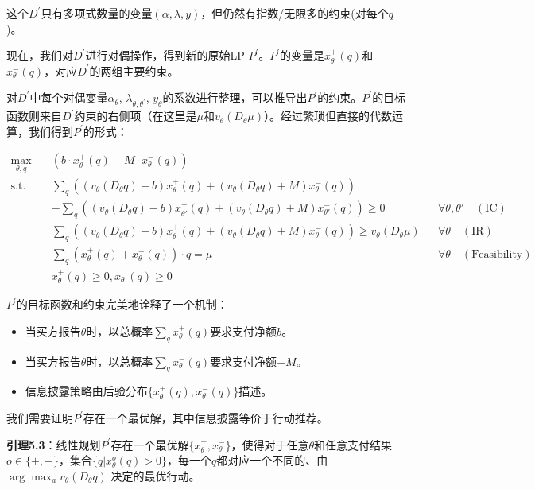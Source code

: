 这个$D^\prime$只有多项式数量的变量$(\alpha,\lambda,y)$，但仍然有指数/无限多的约束(对每个$q$)。

现在，我们对$D^\prime$进行对偶操作，得到新的原始LP $P^\prime$。$P^\prime$的变量是$x_{\theta}^{+}(q)$和$x_{\theta}^{-}(q)$，对应$D^\prime$的两组主要约束。

对$D^\prime$中每个对偶变量$\alpha_\theta$, $\lambda_{\theta,\theta^\prime}$, $y_\theta$的系数进行整理，可以推导出$P^\prime$的约束。$P^\prime$的目标函数则来自$D^\prime$约束的右侧项（在这里是$\mu$和$v_\theta (D_\theta \mu)$）。经过繁琐但直接的代数运算，我们得到$P^\prime$的形式：

\begin{align*}
    \max_{\theta, q} \quad & \left( b \cdot x_{\theta}^{+}(q) - M \cdot x_{\theta}^{-}(q) \right) \\
    \text{s.t.} \quad & \sum_{q} \left((v_{\theta}(D_{\theta}q) - b)x_{\theta}^{+}(q) + (v_{\theta}(D_{\theta}q) + M)x_{\theta}^{-}(q)\right) \\
    & - \sum_{q} \left((v_{\theta}(D_{\theta}q) - b)x_{\theta'}^{+}(q) + (v_{\theta}(D_{\theta}q) + M)x_{\theta'}^{-}(q)\right) \geq 0 && \forall \theta, \theta' \quad (\text{IC}) \\
    & \sum_{q} \left((v_{\theta}(D_{\theta}q) - b)x_{\theta}^{+}(q) + (v_{\theta}(D_{\theta}q) + M)x_{\theta}^{-}(q)\right) \geq v_{\theta}(D_{\theta}\mu) && \forall \theta \quad (\text{IR}) \\
    & \sum_{q} (x_{\theta}^{+}(q) + x_{\theta}^{-}(q)) \cdot q = \mu && \forall \theta \quad (\text{Feasibility}) \\
    & x_{\theta}^{+}(q) \geq 0, x_{\theta}^{-}(q) \geq 0
\end{align*}

$P^\prime$的目标函数和约束完美地诠释了一个机制：
\begin{itemize}
    \item 当买方报告$\theta$时，以总概率$\sum\limits_{q} x_{\theta}^{+}(q)$要求支付净额$b$。
    \item 当买方报告$\theta$时，以总概率$\sum\limits_{q} x_{\theta}^{-}(q)$要求支付净额$-M$。
    \item 信息披露策略由后验分布$\{x_{\theta}^{+} (q), x_{\theta}^{-}(q)\}$描述。
\end{itemize}

我们需要证明$P^\prime$存在一个最优解，其中信息披露等价于行动推荐。

\textbf{引理5.3}：线性规划$P^\prime$存在一个最优解$\{x_{\theta}^{+},x_{\theta}^{-}\}$，使得对于任意$\theta$和任意支付结果
$o \in \{+,-\}$，集合$\{q|x_{\theta}^{o}(q) > 0\}$，每一个$q$都对应一个不同的、由$\arg \max_{a}v_{\theta} (D_{\theta} q)$
决定的最优行动。

